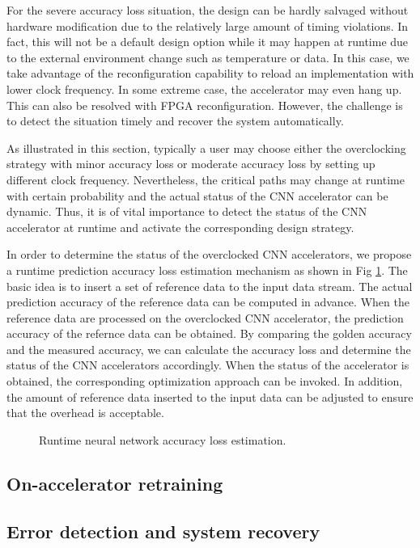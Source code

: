 For the severe accuracy loss situation, the design can be hardly salvaged 
without hardware modification due to the relatively large amount of 
timing violations. In fact, this will not be a default design option while 
it may happen at runtime due to the external environment change such as temperature 
or data. In this case, we take advantage of the reconfiguration 
capability to reload an implementation with lower clock frequency. 
In some extreme case, the accelerator may even hang up. This can also be 
resolved with FPGA reconfiguration. However, the challenge is to 
detect the situation timely and recover the system automatically.

As illustrated in this section, typically a user may choose either the overclocking 
strategy with minor accuracy loss or moderate accuracy loss by setting up 
different clock frequency. Nevertheless, the critical paths 
may change at runtime with certain probability and the actual status of the CNN accelerator 
can be dynamic. Thus, it is of vital importance to detect the status of the CNN 
accelerator at runtime and activate the corresponding design strategy.

In order to determine the status of the overclocked CNN accelerators, 
we propose a runtime prediction accuracy loss estimation mechanism 
as shown in Fig \ref{fig:loss-estimation}. The basic idea is to insert a set 
of reference data to the input data stream. The actual prediction 
accuracy of the reference data can be computed in advance. When the 
reference data are processed on the overclocked CNN accelerator, the 
prediction accuracy of the refernce data can be obtained. By comparing the 
golden accuracy and the measured accuracy, we can calculate the accuracy loss and 
determine the status of the CNN accelerators accordingly. When the status of 
the accelerator is obtained, the corresponding optimization approach 
can be invoked. In addition, the amount of reference data inserted to 
the input data can be adjusted to ensure that the overhead is acceptable.

\begin{figure}
    \caption{Runtime neural network accuracy loss estimation.}
\label{fig:loss-estimation}
\vspace{-1em}
\end{figure}


\subsection{On-accelerator retraining}
\subsection{Error detection and system recovery}

